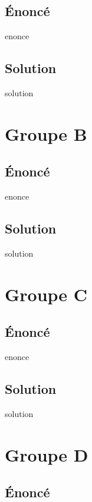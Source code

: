 \documentclass[12pt,A4]{book}
\theoremstyle{definition}
\theoremstyle{thm}
\theoremstyle{def}
\newcounter{sol}[subsection]
\begin{document}
\subsection{Énoncé}

{enonce}

\subsection{Solution}

{solution}


\section{Groupe B}

\subsection{Énoncé}

{enonce}

\subsection{Solution}

{solution}



\section{Groupe C}

\subsection{Énoncé}

{enonce}

\subsection{Solution}

{solution}



\section{Groupe D}

\subsection{Énoncé}
\end{document}
